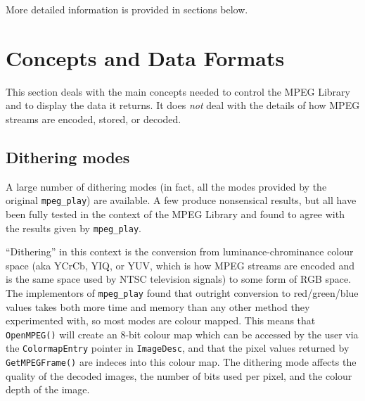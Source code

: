\documentclass[11pt]{article}
\newcommand{\code}[1]{\texttt{#1}}
\begin{document}
More detailed information is provided in sections below.

\section{Concepts and Data Formats}

This section deals with the main concepts needed to control the MPEG
Library and to display the data it returns.  It does {\em not\/} deal
with the details of how MPEG streams are encoded, stored, or decoded.

\subsection{Dithering modes}
\label{sec:dithering}

A large number of dithering modes (in fact, all the modes provided by
the original \code{mpeg\_play}) are available.  A few produce
nonsensical results, but all have been fully tested in the context of
the MPEG Library and found to agree with the results given by
\code{mpeg\_play}.

``Dithering'' in this context is the conversion from
luminance-chrominance colour space (aka YCrCb, YIQ, or YUV, which is
how MPEG streams are encoded and is the same space used by NTSC
television signals) to some form of RGB space.  The implementors of
\code{mpeg\_play} found that outright conversion to red/green/blue
values takes both more time and memory than any other method they
experimented with, so most modes are colour mapped.  This means that
\code{OpenMPEG()} will create an 8-bit colour map which can be
accessed by the user via the \code{ColormapEntry} pointer in
\code{ImageDesc}, and that the pixel values returned by
\code{GetMPEGFrame()} are indeces into this colour map.  The dithering
mode affects the quality of the decoded images, the number of bits
used per pixel, and the colour depth of the image.
\end{document}
